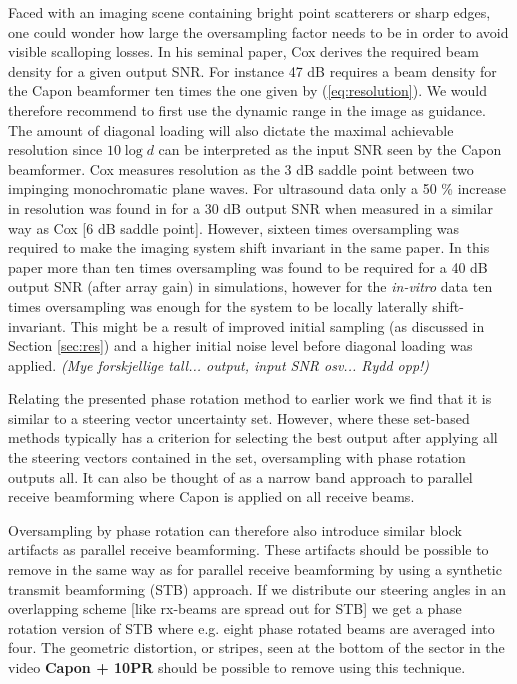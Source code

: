 \documentclass[journal]{IEEEtran}
\newcommand\multimedia[1]{\textbf{{\color{red}#1}}}
\newcommand\comment[1]{\textit{{\color{red}(#1)}}}
\begin{document}
Faced with an imaging scene containing bright point scatterers or sharp edges, one could wonder how large the oversampling factor needs to be in order to avoid visible scalloping losses. In his seminal paper, Cox \cite{Cox1973} derives the required beam density for a given output SNR. For instance 47 dB requires a beam density for the Capon beamformer ten times the one given by (\ref{eq:resolution}). We would therefore recommend to first use the dynamic range in the image as guidance. The amount of diagonal loading will also dictate the maximal achievable resolution since $10\log{d}$ can be interpreted as the input SNR seen by the Capon beamformer. Cox measures resolution as the 3 dB saddle point between two impinging monochromatic plane waves. For ultrasound data only a 50 \% increase in resolution was found in \cite[Fig.~7]{Asen} for a 30 dB output SNR when measured in a similar way as Cox [6 dB saddle point]. However, sixteen times oversampling was required to make the imaging system shift invariant in the same paper. In this paper more than ten times oversampling was found to be required for a 40 dB output SNR (after array gain) in simulations, however for the \textit{in-vitro} data ten times oversampling was enough for the system to be locally laterally shift-invariant. This might be a result of improved initial sampling (as discussed in Section \ref{sec:res}) and a higher initial noise level before diagonal loading was applied. \comment{Mye forskjellige tall... output, input SNR osv... Rydd opp!}

Relating the presented phase rotation method to earlier work we find that it is similar to a steering vector uncertainty set. However, where these set-based methods typically has a criterion for selecting the best output after applying all the steering vectors contained in the set, oversampling with phase rotation outputs all. It can also be thought of as a narrow band approach to parallel receive beamforming where Capon is applied on all receive beams.

Oversampling by phase rotation can therefore also introduce similar block artifacts as parallel receive beamforming. These artifacts should be possible to remove in the same way as for parallel receive beamforming by using a synthetic transmit beamforming (STB) approach. If we distribute our steering angles in an overlapping scheme [like rx-beams are spread out for STB] we get a phase rotation version of STB where e.g. eight phase rotated beams are averaged into four. The geometric distortion, or stripes, seen at the bottom of the sector in the video \multimedia{Capon + 10PR} should be possible to remove using this technique.
\end{document}
